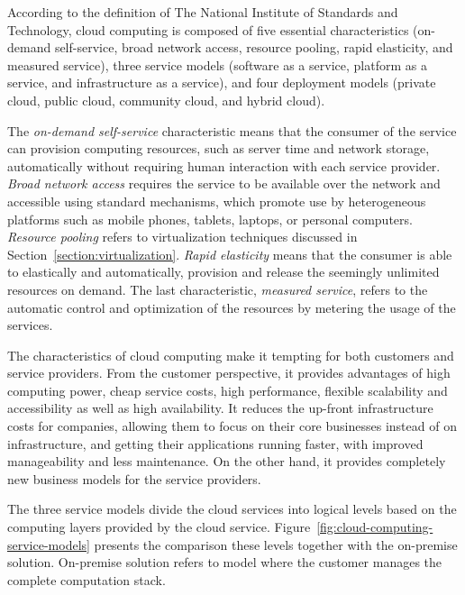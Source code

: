 According to the definition of The National Institute of Standards and Technology, cloud computing is composed of five essential characteristics (on-demand self-service, broad network access, resource pooling, rapid elasticity, and measured service), three service models (software as a service, platform as a service, and infrastructure as a service), and four deployment models (private cloud, public cloud, community cloud, and hybrid cloud).~\cite{Mell:2011:ccdef}

The \emph{on-demand self-service} characteristic means that the consumer of the service can provision computing resources, such as server time and network storage, automatically without requiring human interaction with each service provider. \emph{Broad network access} requires the service to be available over the network and accessible using standard mechanisms, which promote use by heterogeneous platforms such as mobile phones, tablets, laptops, or personal computers. \emph{Resource pooling} refers to virtualization techniques discussed in Section~\ref{section:virtualization}. \emph{Rapid elasticity} means that the consumer is able to elastically and automatically, provision and release the seemingly unlimited resources on demand. The last characteristic, \emph{measured service}, refers to the automatic control and optimization of the resources by metering the usage of the services.~\cite{Mell:2011:ccdef}

The characteristics of cloud computing make it tempting for both customers and service providers. From the customer perspective, it provides advantages of high computing power, cheap service costs, high performance, flexible scalability and accessibility as well as high availability. It reduces the up-front infrastructure costs for companies, allowing them to focus on their core businesses instead of on infrastructure, and getting their applications running faster, with improved manageability and less maintenance. On the other hand, it provides completely new business models for the service providers.~\cite{Mell:2011:ccdef, Dikaiakos:2009:Cloud}

The three service models divide the cloud services into logical levels based on the computing layers provided by the cloud service. Figure~\ref{fig:cloud-computing-service-models} presents the comparison these levels together with the on-premise solution. On-premise solution refers to model where the customer manages the complete computation stack.


